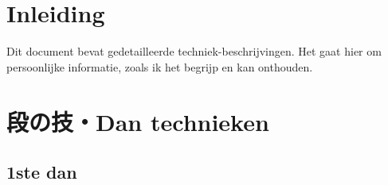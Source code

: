 \documentclass[a4paper, 12pt]{article}
\begin{document}

\begin{CJK*}{UTF8}{min}
\CJKtilde



\newpage
\setcounter{page}{1}
\tableofcontents

\newpage
\setcounter{page}{1}

\section{Inleiding}
\noindent Dit document bevat gedetailleerde techniek-beschrijvingen. Het gaat hier om persoonlijke informatie, zoals ik het begrijp en kan onthouden.

\newpage
\section{段の技・Dan technieken}
\subsection{1ste dan}


%
%
%
%
%
%
%
%
\end{CJK*}
\end{document}
